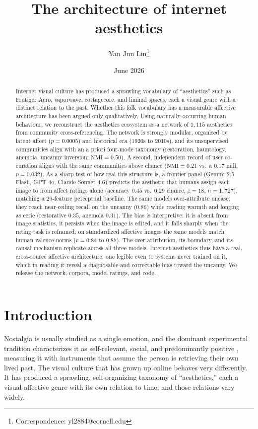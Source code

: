 \documentclass[11pt]{article}
\title{The architecture of internet aesthetics}
\author[1]{Yan Jun Lin\thanks{Correspondence: yl2884@cornell.edu}}
\affil[1]{Cornell University}
\date{June 2026}
\begin{document}
\maketitle

\begin{abstract}
\noindent
Internet visual culture has produced a sprawling vocabulary of ``aesthetics'' such as
Frutiger Aero, vaporwave, cottagecore, and liminal spaces, each a
visual genre with a distinct relation to the past. Whether this folk vocabulary has a measurable
affective architecture has been argued only qualitatively. Using naturally-occurring human behaviour, we reconstruct the
aesthetics ecosystem as a network of $1{,}115$ aesthetics from community cross-referencing. The
network is strongly modular, organised by latent affect ($p=0.0005$) and historical era ($1920$s
to $2010$s), and its unsupervised communities align with an a priori four-mode taxonomy
(restoration, hauntology, anemoia, uncanny inversion; $\mathrm{NMI}=0.50$). A second, independent
record of user co-curation aligns with the same communities above chance ($\mathrm{NMI}=0.21$
vs.\ a $0.17$ null, $p=0.032$). As a sharp test of how real this structure is, a frontier panel
(Gemini 2.5 Flash, GPT-4o, Claude Sonnet 4.6) predicts the aesthetic that humans assign each image
to from affect ratings alone (accuracy $0.45$ vs.\ $0.29$ chance, $z=18$, $n=1{,}727$), matching a 29-feature
perceptual baseline. The same models over-attribute unease: they reach near-ceiling recall on the
uncanny ($0.86$) while reading warmth and longing as eerie (restorative $0.35$, anemoia $0.31$).
The bias is interpretive: it is absent from image statistics, it persists when the image is
edited, and it falls sharply when the rating task is reframed; on standardized affective images
the same models match human valence norms ($r=0.84$ to $0.87$). The over-attribution, its
boundary, and its causal mechanism replicate across all three models. Internet aesthetics thus
have a real, cross-source affective architecture, one legible even to systems never trained on it,
which in reading it reveal a diagnosable and correctable bias toward the uncanny. We release the
network, corpora, model ratings, and code.
\end{abstract}

\section{Introduction}

Nostalgia is usually studied as a single emotion, and the dominant experimental tradition
characterizes it as self-relevant, social, and predominantly positive
\citep{wildschut2006, routledge2011, sedikides2018, batcho1995}, measuring it
with instruments that assume the person is retrieving their own lived past. The visual
culture that has grown up online behaves very differently. It has produced a sprawling,
self-organizing taxonomy of ``aesthetics,'' each a visual-affective genre with its own relation
to time, and those relations vary widely.
\end{document}
